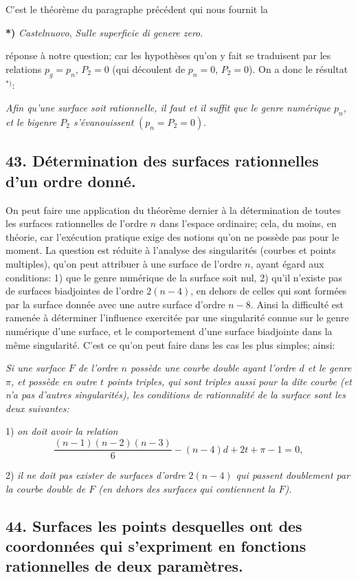 \documentclass{article}
\begin{document}
C'est le théorème du paragraphe précédent qui nous fournit la

\textbf{*)} \emph{Castelnuovo}, \emph{Sulle superficie di genere zero}.

réponse à notre question; car les hypothèses qu'on y fait se traduisent par les relations $p_{g} = p_{n}$, $P_{2} = 0$ (qui découlent de $p_{n} = 0$, $P_{2} = 0$). On a donc le résultat${}^{*)}$:

\emph{Afin qu'une surface soit rationnelle, il faut et il suffit que le genre numérique $p_{n}$, et le bigenre $P_{2}$ s'évanouissent} $(p_{n} = P_{2} = 0)$.

\subsection*{43. Détermination des surfaces rationnelles d'un ordre donné.}

On peut faire une application du théorème dernier à la détermination de toutes les surfaces rationnelles de l'ordre $n$ dans l'espace ordinaire; cela, du moins, en théorie, car l'exécution pratique exige des notions qu'on ne possède pas pour le moment. La question est réduite à l'analyse des singularités (courbes et points multiples), qu'on peut attribuer à une surface de l'ordre $n$, ayant égard aux conditions: 1) que le genre numérique de la surface soit nul, 2) qu'il n'existe pas de surfaces biadjointes de l'ordre $2(n-4)$, en dehors de celles qui sont formées par la surface donnée avec une autre surface d'ordre $n - 8$. Ainsi la difficulté est ramenée à déterminer l'influence exercitée par une singularité connue sur le genre numérique d'une surface, et le comportement d'une surface biadjointe dans la même singularité. C'est ce qu'on peut faire dans les cas les plus simples; ainsi:

\emph{Si une surface $F$ de l'ordre $n$ possède une courbe double ayant l'ordre $d$ et le genre $\pi$, et possède en outre $t$ points triples, qui sont triples aussi pour la dite courbe (et n'a pas d'autres singularités), les conditions de rationnalité de la surface sont les deux suivantes:}

1) \emph{on doit avoir la relation}
\[ \frac{(n-1)(n-2)(n-3)}{6} - (n-4)d + 2t + \pi - 1 = 0, \]

2) \emph{il ne doit pas exister de surfaces d'ordre $2(n-4)$ qui passent doublement par la courbe double de $F$ (en dehors des surfaces qui contiennent la $F$).}

\subsection*{44. Surfaces les points desquelles ont des coordonnées qui s'expriment en fonctions rationnelles de deux paramètres.}
\end{document}
